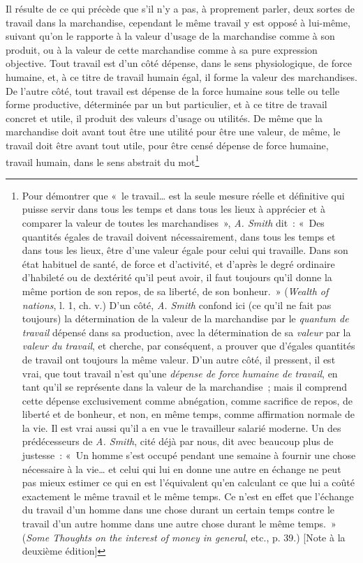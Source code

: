 \documentclass[french,twoside]{book} %
\begin{document}
Il résulte de ce qui précède que s’il n’y a pas, à proprement parler, deux sortes de travail dans la marchandise, cependant le même travail y est opposé à lui-même, suivant qu’on le rapporte à la valeur d’usage de la marchandise comme à son produit, ou à la valeur de cette marchandise comme à sa pure expression objective. Tout travail est d’un côté dépense, dans le sens physiologique, de force humaine, et, à ce titre de travail humain égal, il forme la valeur des marchandises. De l’autre côté, tout travail est dépense de la force humaine sous telle ou telle forme productive, déterminée par un but particulier, et à ce titre de travail concret et utile, il produit des valeurs d’usage ou utilités. De même que la marchandise doit avant tout être une utilité pour être une valeur, de même, le travail doit être avant tout utile, pour être censé dépense de force humaine, travail humain, dans le sens abstrait du mot\footnote{ \noindent Pour démontrer que « le travail… est la seule mesure réelle et définitive qui puisse servir dans tous les temps et dans tous les lieux à apprécier et à comparer la valeur de toutes les marchandises », \emph{A. Smith} dit : « Des quantités égales de travail doivent nécessairement, dans tous les temps et dans tous les lieux, être d’une valeur égale pour celui qui travaille. Dans son état habituel de santé, de force et d’activité, et d’après le degré ordinaire d’habileté ou de dextérité qu’il peut avoir, il faut toujours qu’il donne la même portion de son repos, de sa liberté, de son bonheur. » (\emph{Wealth of nations}, l. 1, ch. v.) D’un côté, \emph{A. Smith} confond ici (ce qu’il ne fait pas toujours) la détermination de la valeur de la marchandise par le \emph{quantum de travail} dépensé dans sa production, avec la détermination de sa \emph{valeur} par la \emph{valeur du travail}, et cherche, par conséquent, a prouver que d’égales quantités de travail ont toujours la même valeur. D’un autre côté, il pressent, il est vrai, que tout travail n’est qu’une \emph{dépense de force humaine de travail}, en tant qu’il se représente dans la valeur de la marchandise ; mais il comprend cette dépense exclusivement comme abnégation, comme sacrifice de repos, de liberté et de bonheur, et non, en même temps, comme affirmation normale de la vie. Il est vrai aussi qu’il a en vue le travailleur salarié moderne. Un des prédécesseurs de \emph{A. Smith}, cité déjà par nous, dit avec beaucoup plus de justesse : « Un homme s’est occupé pendant une semaine à fournir une chose nécessaire à la vie… et celui qui lui en donne une autre en échange ne peut pas mieux estimer ce qui en est l’équivalent qu’en calculant ce que lui a coûté exactement le même travail et le même temps. Ce n’est en effet que l’échange du travail d’un homme dans une chose durant un certain temps contre le travail d’un autre homme dans une autre chose durant le même temps. » (\emph{Some Thoughts on the interest of money in general}, etc., p. 39.) [Note à la deuxième édition]\par
}
\end{document}
